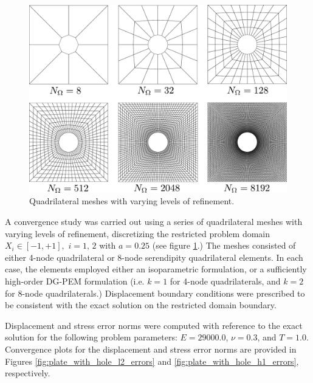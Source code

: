 \begin{figure}[!h]
  \centering
  \includegraphics[width=6.0in]{figures/quad_hole_meshes.pdf}
  \caption{Quadrilateral meshes with varying levels of refinement.}
  \label{fig:plate_with_hole_meshes}
\end{figure}
A convergence study was carried out using a series of quadrilateral meshes with varying levels of refinement, discretizing the restricted problem domain $X_i \in [ -1, +1], \, \, i = 1, \, 2$ with $a = 0.25$ (see figure \ref{fig:plate_with_hole_meshes}.) The meshes consisted of either 4-node quadrilateral or 8-node serendipity quadrilateral elements. In each case, the elements employed either an isoparametric formulation, or a sufficiently high-order DG-PEM formulation (i.e. $k=1$ for 4-node quadrilaterals, and $k=2$ for 8-node quadrilaterals.) Displacement boundary conditions were prescribed to be consistent with the exact solution on the restricted domain boundary.

Displacement and stress error norms were computed with reference to the exact solution for the following problem parameters: $E = 29000.0$, $\nu = 0.3$, and $T = 1.0$. Convergence plots for the displacement and stress error norms are provided in Figures \ref{fig:plate_with_hole_l2_errors} and \ref{fig:plate_with_hole_h1_errors}, respectively.


